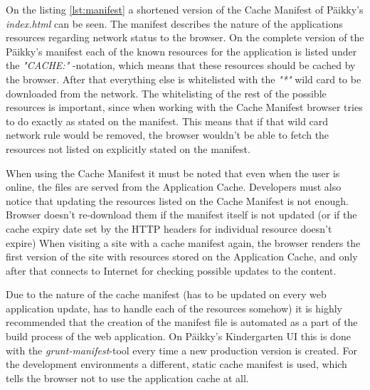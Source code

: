 On the listing \ref{lst:manifest} a shortened version of the Cache Manifest of Päikky's \textit{index.html} can be seen. The manifest describes the nature of the applications resources regarding network status to the browser. On the complete version of the Päikky's manifest each of the known resources for the application is listed under the \textit{"CACHE:"} -notation, which means that these resources should be cached by the browser. After that everything else is whitelisted with the \textit{"*"} wild card to be downloaded from the network. The whitelisting of the rest of the possible resources is important, since when working with the Cache Manifest browser tries to do exactly as stated on the manifest. This means that if that wild card network rule would be removed, the browser wouldn't be able to fetch the resources not listed on explicitly stated on the manifest. \cite[Page 212]{lawson_introducing_2011}%


When using the Cache Manifest it must be noted that even when the user is online, the files are served from the Application Cache. Developers must also notice that updating the resources listed on the Cache Manifest is not enough. Browser doesn't re-download them if the manifest itself is not updated (or if the cache expiry date set by the HTTP headers for individual resource doesn't expire) When visiting a site with a cache manifest again, the browser renders the first version of the site with resources stored on the Application Cache, and only after that connects to Internet for checking possible updates to the content. \cite{archibald_application_2012}

Due to the nature of the cache manifest (has to be updated on every web application update, has to handle each of the resources somehow) it is highly recommended that the creation of the manifest file is automated as a part of the build process of the web application. On Päikky's Kindergarten UI this is done with the \textit{grunt-manifest}-tool every time a new production version is created. For the development environments a different, static cache manifest is used, which tells the browser not to use the application cache at all.

